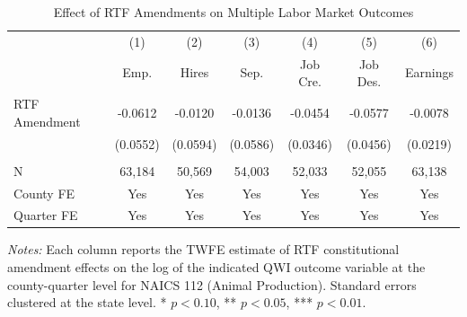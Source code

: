 \begin{table}[H]
\centering
\caption{Effect of RTF Amendments on Multiple Labor Market Outcomes}
\label{tab:outcomes}
\begin{threeparttable}
\footnotesize
\begin{tabular}{lcccccc}
\toprule
 & (1) & (2) & (3) & (4) & (5) & (6) \\
 & Emp. & Hires & Sep. & Job Cre. & Job Des. & Earnings \\
\midrule
RTF Amendment & -0.0612 & -0.0120 & -0.0136 & -0.0454 & -0.0577 & -0.0078 \\
 & (0.0552) & (0.0594) & (0.0586) & (0.0346) & (0.0456) & (0.0219) \\
\\
N & 63,184 & 50,569 & 54,003 & 52,033 & 52,055 & 63,138 \\
County FE & Yes & Yes & Yes & Yes & Yes & Yes \\
Quarter FE & Yes & Yes & Yes & Yes & Yes & Yes \\
\bottomrule
\end{tabular}
\begin{tablenotes}[flushleft]
\small
\item \textit{Notes:} Each column reports the TWFE estimate of RTF constitutional amendment effects on the log of the indicated QWI outcome variable at the county-quarter level for NAICS 112 (Animal Production). Standard errors clustered at the state level. * $p<0.10$, ** $p<0.05$, *** $p<0.01$.
\end{tablenotes}
\end{threeparttable}
\end{table}
